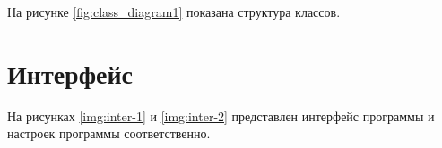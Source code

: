 \begin{itemize}
На рисунке \ref{fig:class_diagram1} показана структура классов.

\begin{figure}[ht!]
\end{figure}

\end{itemize}

\section{Интерфейс}

На рисунках \ref{img:inter-1} и \ref{img:inter-2} представлен интерфейс программы и настроек программы соответственно.

\begin{figure}[ht!]
\end{figure}


